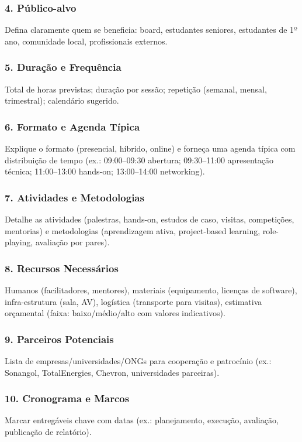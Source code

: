 \documentclass[12pt,a4paper]{article}
\begin{document}
\subsubsection*{4. Público-alvo}
Defina claramente quem se beneficia: board, estudantes seniores, estudantes de 1º ano, comunidade local, profissionais externos.

\subsubsection*{5. Duração e Frequência}
Total de horas previstas; duração por sessão; repetição (semanal, mensal, trimestral); calendário sugerido.

\subsubsection*{6. Formato e Agenda Típica}
Explique o formato (presencial, híbrido, online) e forneça uma agenda típica com distribuição de tempo (ex.: 09:00–09:30 abertura; 09:30–11:00 apresentação técnica; 11:00–13:00 hands-on; 13:00–14:00 networking).

\subsubsection*{7. Atividades e Metodologias}
Detalhe as atividades (palestras, hands-on, estudos de caso, visitas, competições, mentorias) e metodologias (aprendizagem ativa, project-based learning, role-playing, avaliação por pares).

\subsubsection*{8. Recursos Necessários}
Humanos (facilitadores, mentores), materiais (equipamento, licenças de software), infra-estrutura (sala, AV), logística (transporte para visitas), estimativa orçamental (faixa: baixo/médio/alto com valores indicativos).

\subsubsection*{9. Parceiros Potenciais}
Lista de empresas/universidades/ONGs para cooperação e patrocínio (ex.: Sonangol, TotalEnergies, Chevron, universidades parceiras).

\subsubsection*{10. Cronograma e Marcos}
Marcar entregáveis chave com datas (ex.: planejamento, execução, avaliação, publicação de relatório).
\end{document}
